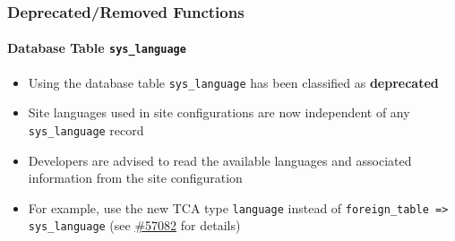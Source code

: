 %

\begin{frame}[fragile]
	\frametitle{Deprecated/Removed Functions}
	\framesubtitle{Database Table \texttt{sys\_language}}

	\begin{itemize}
		\item Using the database table \texttt{sys\_language} has been classified
			as \textbf{deprecated}
		\item Site languages used in site configurations are now independent
			of any \texttt{sys\_language} record
		\item Developers are advised to read the available languages and
			associated information from the site configuration
		\item For example, use the new TCA type \texttt{language} instead of
			\texttt{foreign\_table => sys\_language}
			(see \href{https://forge.typo3.org/issues/57082}{\#57082} for details)
	\end{itemize}

\end{frame}

